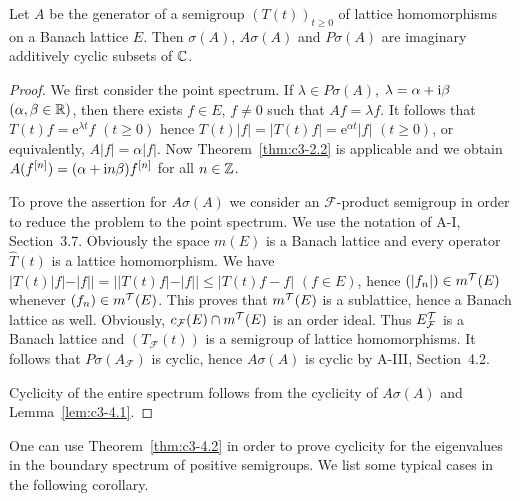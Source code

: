\begin{theorem}\label{thm:c3-4.2}
	Let $A$ be the generator of a semigroup $(T(t))_{t \geq 0}$ of lattice homomorphisms on a Banach lattice $E$. 
	Then $\sigma(A)$, $A\sigma(A)$ and $P\sigma(A)$ are imaginary additively cyclic subsets of $\mathbb{C} $.
\end{theorem}

\begin{proof}
	We first consider the point spectrum. 
	If $\lambda \in P\sigma(A)$, $\lambda = \alpha + \mathrm{i}\beta$ $(\alpha,\beta \in \mathbb{R} )$, then there exists $f \in E$, $f \neq 0$ such that $Af = \lambda f$. 
	It follows that $T(t)f = \mathrm{e}^{\lambda t}f$ $(t \geq 0)$ hence $T(t)|f| = |T(t)f| = \mathrm{e}^{\alpha t}|f|$ $(t \geq 0)$, or equivalently, $A|f| = \alpha|f|$. 
	Now Theorem~\ref{thm:c3-2.2} is applicable and we obtain $A(f^{[n]}) = (\alpha + \mathrm{i} n\beta)f^{[n]}$ for all $n \in \mathbb{Z}$.
	
	To prove the assertion for $A\sigma(A)$ we consider an $\mathcal{F}$-product semigroup in order to reduce the problem to the point spectrum. 
	We use the notation of A-I, Section~3.7. 
	Obviously the space $m(E)$ is a Banach lattice and every operator $\hat{T}(t)$ is a lattice homomorphism. 
	We have $|T(t)|f| - |f|| = ||T(t)f| - |f|| \leq |T(t)f - f|$ $(f \in E)$, hence $(|f_{n}|) \in m^{\mathcal{T}}(E)$ whenever $(f_{n}) \in m^{\mathcal{T}}(E)$. 
	This proves that $m^{\mathcal{T}}(E)$ is a sublattice, hence a Banach lattice as well. 
	Obviously, $c_{\mathcal{F}}(E)\cap m^{\mathcal{T}}(E)$ is an order ideal. 
	Thus $E_{\mathcal{F}}^{\mathcal{T}}$ is a Banach lattice and $(T_{\mathcal{F}}(t))$ is a semigroup of lattice homomorphisms. 
	It follows that $P\sigma(A_{\mathcal{F}})$ is cyclic, hence $A\sigma(A)$ is cyclic by A-III, Section~4.2.
	
	Cyclicity of the entire spectrum follows from the cyclicity of $A\sigma(A)$ and Lemma~\ref{lem:c3-4.1}.
\end{proof}

One can use Theorem~\ref{thm:c3-4.2} in order to prove cyclicity for the eigenvalues in the boundary spectrum of positive semigroups. 
We list some typical cases in the following corollary.

